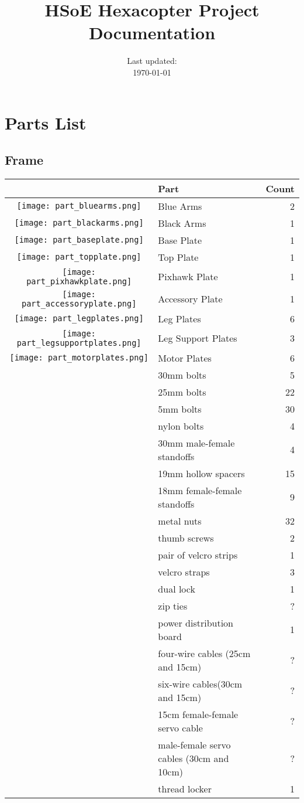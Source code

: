 \documentclass{style}
\title{HSoE Hexacopter Project Documentation}
\author{\linkurl{https://github.com/nickgn12/hsoe-hexacopter-docs}}
\date{Last updated:\\ \today{}}
\begin{document}
\maketitle
\newpage
\tableofcontents
\newpage
\section{Parts List}
\subsection{Frame}
\begin{tabular}{|c|l|r|}
  \hline
  & \textbf{Part} & \textbf{Count} \\
  \hline
  \texttt{[image: part\_bluearms.png]}  & Blue Arms & 2 \\
  \hline
  \texttt{[image: part\_blackarms.png]} & Black Arms & 1 \\
  \hline
  \texttt{[image: part\_baseplate.png]} & Base Plate & 1 \\
  \hline
  \texttt{[image: part\_topplate.png]} & Top Plate & 1 \\
  \hline
  \texttt{[image: part\_pixhawkplate.png]} & Pixhawk Plate & 1 \\
  \hline
  \texttt{[image: part\_accessoryplate.png]} & Accessory Plate & 1 \\
  \hline
  \texttt{[image: part\_legplates.png]} & Leg Plates & 6 \\
  \hline
  \texttt{[image: part\_legsupportplates.png]} & Leg Support Plates & 3 \\
  \hline
  \texttt{[image: part\_motorplates.png]} & Motor Plates & 6 \\
  & 30mm bolts & 5 \\
  \hline
  & 25mm bolts & 22 \\
  \hline
  & 5mm bolts & 30 \\
  \hline
  & nylon bolts & 4 \\
  \hline
  & 30mm male-female standoffs & 4 \\
  \hline
  & 19mm hollow spacers & 15 \\
  \hline
  & 18mm female-female standoffs & 9 \\
  \hline
  & metal nuts & 32 \\
  \hline
  & thumb screws & 2 \\
  \hline
  & pair of velcro strips & 1 \\
  \hline
  & velcro straps & 3 \\
  \hline
  & dual lock & 1 \\
  \hline
  & zip ties & ? \\
  \hline
  & power distribution board & 1 \\
  \hline
  & four-wire cables (25cm and 15cm) & ? \\
  \hline
  & six-wire cables(30cm and 15cm) & ? \\
  \hline
  & 15cm female-female servo cable & ? \\
  \hline
  & male-female servo cables (30cm and 10cm) & ? \\
  \hline
  & thread locker & 1 \\
  \hline
\end{tabular}
\end{document}
